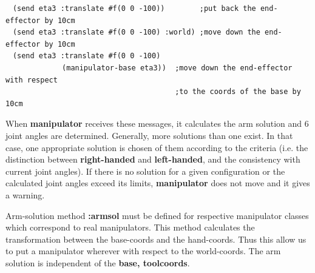 \begin{verbatim}
　(send eta3 :translate #f(0 0 -100))        ;put back the end-effector by 10cm
　(send eta3 :translate #f(0 0 -100) :world) ;move down the end-effector by 10cm
　(send eta3 :translate #f(0 0 -100)
             (manipulator-base eta3))  ;move down the end-effector with respect 
                                       ;to the coords of the base by 10cm
\end{verbatim}


When {\bf manipulator} receives these messages, it calculates the arm solution 
and 6 joint angles are determined. Generally, more solutions than one exist.
In that case, one appropriate solution is chosen of them according to the 
criteria (i.e. the distinction between {\bf right-handed} and {\bf left-handed},
and the consistency with current joint angles). If there is no solution for 
a given configuration or the calculated joint angles exceed its limits, 
{\bf manipulator} does not move and it gives a warning.


Arm-solution method {\bf :armsol} must be defined for respective manipulator 
classes which correspond to real manipulators. This method calculates the 
transformation between the base-coords and the hand-coords. Thus this allow us 
to put a manipulator wherever with respect to the world-coords. The arm solution 
is independent of the {\bf base, toolcoords}.


